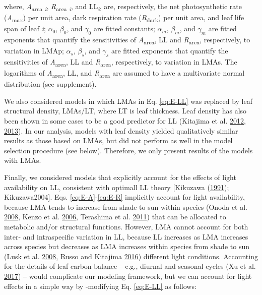 \documentclass[
  12pt,
]{article}
\begin{document}
where, \emph{A}\textsubscript{area} \textsubscript{\emph{i}}, \emph{R}\textsubscript{area} \textsubscript{\emph{i}}, and LL\textsubscript{\emph{i}}, are, respectively, the net photosynthetic rate (\emph{A}\textsubscript{max}) per unit area, dark respiration rate (\emph{R}\textsubscript{dark}) per unit area, and leaf life span of leaf \emph{i}; \(\alpha_0\), \(\beta_0\), and \(\gamma_0\) are fitted constants; \(\alpha_m\), \(\beta_m\), and \(\gamma_m\) are fitted exponents that quantify the sensitivities of \emph{A}\textsubscript{area}, LL and \emph{R}\textsubscript{area}, respectively, to variation in LMAp; \(\alpha_s\), \(\beta_s\), and \(\gamma_s\) are fitted exponents that quantify the sensitivities of \emph{A}\textsubscript{area}, LL and \emph{R}\textsubscript{area}, respectively, to variation in LMAs.
The logarithms of \emph{A}\textsubscript{area}, LL, and \emph{R}\textsubscript{area} are assumed to have a multivariate normal distribution (see supplement).

We also considered models in which LMAs in Eq. \eqref{eq:E-LL} was replaced by leaf structural density, LMAs/LT, where LT is leaf thickness.
Leaf density has also been shown in some cases to be a good predictor for LL (Kitajima et al. \protect\hyperlink{ref-Kitajima2012}{2012}, \protect\hyperlink{ref-Kitajima2013}{2013}).
In our analysis, models with leaf density yielded qualitatively similar results as those based on LMAs, but did not perform as well in the model selection procedure (see below).
Therefore, we only present results of the models with LMAs.

Finally, we considered models that explicitly account for the effects of light availability on LL, consistent with optimall LL theory {[}Kikuzawa (\protect\hyperlink{ref-Kikuzawa1991}{1991}); Kikuzawa2004{]}.
Eqs. \eqref{eq:E-A}-\eqref{eq:E-R} implicitly account for light availability, because LMA tends to increase from shade to sun within species (Onoda et al. \protect\hyperlink{ref-Onoda2008}{2008}, Kenzo et al. \protect\hyperlink{ref-Kenzo2006}{2006}, Terashima et al. \protect\hyperlink{ref-Terashima2011}{2011}) that can be allocated to metabolic and/or structural functions.
However, LMA cannot account for both inter- and intraspecific variation in LL, because LL increases as LMA increases across species but decreases as LMA increases within species from shade to sun (Lusk et al. \protect\hyperlink{ref-Lusk2008}{2008}, Russo and Kitajima \protect\hyperlink{ref-Russo2016}{2016}) different light conditions.
Accounting for the details of leaf carbon balance -- e.g., diurnal and seasonal cycles (Xu et al. \protect\hyperlink{ref-Xu2017}{2017}) -- would complicate our modeling framework, but we can account for light effects in a simple way by -modifying Eq. \eqref{eq:E-LL} as follows:
\end{document}
